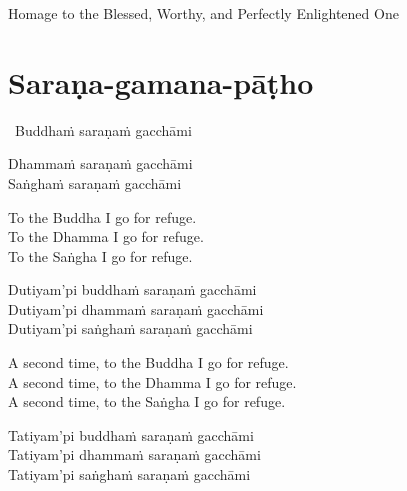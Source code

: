 \begin{english}
  Homage to the Blessed, Worthy, and Perfectly Enlightened One
\end{english}


\section{Saraṇa-gamana-pāṭho}
\label{sarana-gamana-patho}

\begin{pali-leader}
  \anglebracketleft\ \hspace{-0.5mm}Buddhaṁ saraṇaṁ gacchāmi \hspace{-0.5mm}\anglebracketright\
\end{pali-leader}
\begin{pali-hangtogether}
  Dhammaṁ saraṇaṁ gacchāmi\\
  Saṅghaṁ saraṇaṁ gacchāmi
\end{pali-hangtogether}

\begin{english-verses}
  To the Buddha I go for refuge.\\
  To the Dhamma I go for refuge.\\
  To the Saṅgha I go for refuge.
\end{english-verses}

\begin{pali-hang-continued}
  Dutiyam'pi buddhaṁ saraṇaṁ gacchāmi\\
  Dutiyam'pi dhammaṁ saraṇaṁ gacchāmi\\
  Dutiyam'pi saṅghaṁ saraṇaṁ gacchāmi
\end{pali-hang-continued}

\begin{english-verses}
  A second time, to the Buddha I go for refuge.\\
  A second time, to the Dhamma I go for refuge.\\
  A second time, to the Saṅgha I go for refuge.
\end{english-verses}

\begin{pali-hang-continued}
  Tatiyam'pi buddhaṁ saraṇaṁ gacchāmi\\
  Tatiyam'pi dhammaṁ saraṇaṁ gacchāmi\\
  Tatiyam'pi saṅghaṁ saraṇaṁ gacchāmi
\end{pali-hang-continued}

